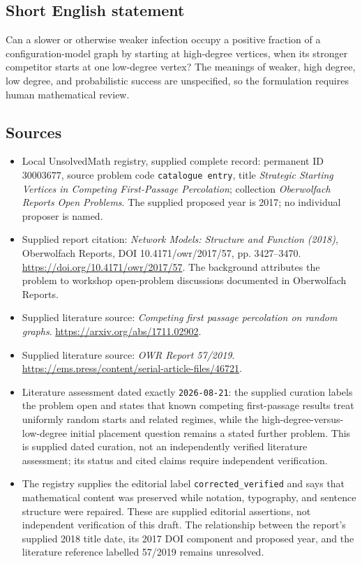 \documentclass[11pt]{article}
\begin{document}
\subsection{Short English statement}
Can a slower or otherwise weaker infection occupy a positive fraction of a configuration-model graph by starting at high-degree vertices, when its stronger competitor starts at one low-degree vertex? The meanings of weaker, high degree, low degree, and probabilistic success are unspecified, so the formulation requires human mathematical review.
\subsection{Sources}
\begin{itemize}
\item Local UnsolvedMath registry, supplied complete record: permanent ID \(30003677\), source problem code \texttt{catalogue entry}, title \emph{Strategic Starting Vertices in Competing First-Passage Percolation}; collection \emph{Oberwolfach Reports Open Problems}. The supplied proposed year is 2017; no individual proposer is named.
\item Supplied report citation: \emph{Network Models: Structure and Function (2018)}, Oberwolfach Reports, DOI 10.4171/owr/2017/57, pp. 3427--3470. \url{https://doi.org/10.4171/owr/2017/57}. The background attributes the problem to workshop open-problem discussions documented in Oberwolfach Reports.
\item Supplied literature source: \emph{Competing first passage percolation on random graphs}. \url{https://arxiv.org/abs/1711.02902}.
\item Supplied literature source: \emph{OWR Report 57/2019}. \url{https://ems.press/content/serial-article-files/46721}.
\item Literature assessment dated exactly \texttt{2026-08-21}: the supplied curation labels the problem open and states that known competing first-passage results treat uniformly random starts and related regimes, while the high-degree-versus-low-degree initial placement question remains a stated further problem. This is supplied dated curation, not an independently verified literature assessment; its status and cited claims require independent verification.
\item The registry supplies the editorial label \texttt{corrected\_verified} and says that mathematical content was preserved while notation, typography, and sentence structure were repaired. These are supplied editorial assertions, not independent verification of this draft. The relationship between the report's supplied 2018 title date, its 2017 DOI component and proposed year, and the literature reference labelled 57/2019 remains unresolved.
\end{itemize}
\end{document}
